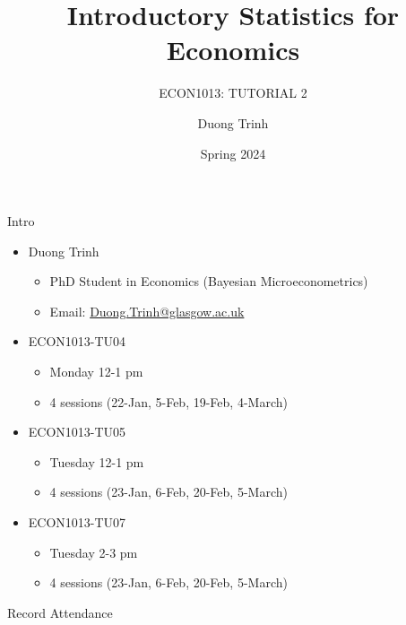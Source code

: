 \documentclass[
  11pt,
  ignorenonframetext,
]{beamer}
\title{Introductory Statistics for Economics}
\subtitle{ECON1013: TUTORIAL 2}
\author{Duong Trinh}
\date{Spring 2024}
\institute{University of Glasgow}
\providecommand{\tightlist}{%
  \setlength{\itemsep}{0pt}\setlength{\parskip}{0pt}}
\begin{document}
\frame{\titlepage}

\begin{frame}{Intro}
\protect\hypertarget{intro}{}
\begin{itemize}
\tightlist
\item
  Duong Trinh

  \begin{itemize}
  \tightlist
  \item
    PhD Student in Economics (Bayesian Microeconometrics)
  \item
    Email: \underline{Duong.Trinh@glasgow.ac.uk}
  \end{itemize}
\end{itemize}

\vspace{3mm}

\begin{itemize}
\tightlist
\item
  ECON1013-TU04

  \begin{itemize}
  \tightlist
  \item
    Monday 12-1 pm
  \item
    4 sessions (22-Jan, 5-Feb, 19-Feb, 4-March)
  \end{itemize}
\item
  ECON1013-TU05

  \begin{itemize}
  \tightlist
  \item
    Tuesday 12-1 pm
  \item
    4 sessions (23-Jan, 6-Feb, 20-Feb, 5-March)
  \end{itemize}
\item
  ECON1013-TU07

  \begin{itemize}
  \tightlist
  \item
    Tuesday 2-3 pm
  \item
    4 sessions (23-Jan, 6-Feb, 20-Feb, 5-March)
  \end{itemize}
\end{itemize}
\end{frame}

\begin{frame}{Record Attendance}
\protect\hypertarget{record-attendance}{}
\end{frame}
\end{document}

